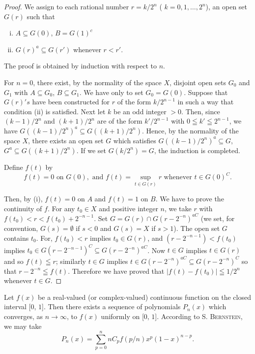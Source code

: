 \begin{proof}
 We assign to each rational number $r = k / 2^n$ ( $k = 0, 1, \ldots, 2^n$), an open set $G(r)$ such that \begin{enumerate}[(i)]
\item $A \subseteq G(0)$, $B = G(1)^c$
\item $G(r)^a \subseteq G(r')$ whenever $r < r'$.
\end{enumerate}
 The proof is obtained by induction with respect to $n$.

For $n = 0$, there exist, by the normality of the space $X$, disjoint open sets $G_0$ and $G_1$ with $A \subseteq G_0$, $B \subseteq G_1$. We have only to set $G_0 = G(0)$. Suppose that $G(r)'s$ have been constructed for $r$ of the form $k/2^{n-1}$ in such a way that condition (ii) is satisfied. Next let $k$ be an odd integer $> 0$. Then, since $(k-1)/2^n$ and $(k+1)/2^n$ are of the form $k'/2^{n-1}$ with $0 \leqq k' \leqq 2^{n-1}$, we have $G((k-1)/2^n)^a \subseteq G((k+1)/2^n)$. Hence, by the normality of the space $X$, there exists an open set $G$ which satisfies $G((k-1)/2^n)^a \subseteq G$, $G^a \subseteq G((k+1)/2^n)$. If we set $G(k/2^n) = G$, the induction is completed. 

Define $f(t)$ by 
\[
f (t) = 0 \text{ on } G (0), \text{ and } f (t) = \sup\limits _{t \in G (r)} r \text{ whenever } t \in G (0) ^{C}.
\]

Then, by (i), $f(t) = 0$ on $A$ and $f(t) = 1$ on $B$. We have to prove the continuity of $f$. For any $t_0 \in X$ and positive integer $n$, we take $r$ with $f(t_0) < r < f(t_0) + 2^{-n-1}$. Set $G = G(r) \cap G(r- 2^{-n})^{aC}$ (we set, for convention, $G(s) = \emptyset$ if $s < 0$ and $G(s) = X$ if $s > 1$). The open set $G$ contains $t_0$. For, $f(t_0) < r$ implies $t_0 \in G(r)$, and $(r- 2^{-n-1}) < f(t_0)$ implies $t_0 \in G(r- 2^{-n-1})^C \subseteq G(r- 2^{-n})^{aC}$. Now $t \in G$ implies $t \in G(r)$ and so $f(t) \leqq r$; similarly $t \in G$ implies $t \in G(r- 2^{-n})^{aC} \subseteq G(r- 2^{-n})^C$ so that $r- 2^{-n} \leqq f(t)$. Therefore we have proved that $|f(t)- f(t_0)| \leqq 1/2^n$ whenever $t \in G$. 
\end{proof}

\begin{theoremn} Let $f(x)$ be a real-valued (or complex-valued) continuous function on the closed interval [$0$, $1$]. Then there exists a sequence of polynomials $P_{n}(x)$ which converges, as $n \to \infty$, to $f(x)$ uniformly on [$0$, $1$]. According to S. \textsc{Bernstein}, we may take 
\begin{equation}\label{eq:0.2.1}
P _{n} (x) = \sum\limits_{p=0} ^{n} n C _{p} f (p / n) x ^{p} (1- x) ^{n-p}.
\end{equation}
\end{theoremn}

